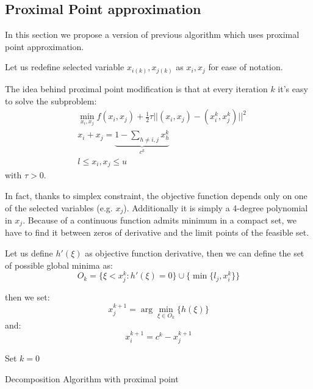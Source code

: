 \subsection{Proximal Point approximation}
In this section we propose a version of previous algorithm which uses proximal point approximation.

Let us redefine selected variable $x_{i(k)},x_{j(k)}$ as $x_{i},x_{j}$ for ease of notation.

The idea behind proximal point modification is that at every iteration $k$ it's easy to solve the subproblem:
\begin{align}
 &\min_{x_i,x_j} f(x_i,x_j)+ \frac{1}{2} \tau||(x_i,x_j)-(x_i^k,x_j^k)||^2\\
 &x_i+x_j = \underbrace{1-\sum_{h \ne i,j} x^k_h}_{c^k}\\
 &l \le x_i,x_j\le u
 \end{align}
with $\tau>0$.

In fact, thanks to simplex constraint, the objective function depends only on one of the selected variables (e.g. $x_j$). 
Additionally it is simply a 4-degree polynomial in $x_j$.
Because of a continuous function admits minimum in a compact set, we have to find it between zeros of derivative and the limit points of the feasible set.

Let us define $h'(\xi)$ as objective function derivative, then we can define the set of possible global minima as:
\begin{equation}
 O_k = \{ \xi < x_j^k: h'(\xi)=0\} \cup \{\min\{l_j,x_i^k\} \}
\end{equation}

then we set:
\begin{equation}
x_j^{k+1}= \arg \min_{\xi \in O_k} \{h(\xi)\}
\end{equation}
and:
\begin{equation}
x_i^{k+1}= c^{k}-x^{k+1}_j
\end{equation}



\begin{algorithm}[ht]
 Set $k = 0$\\
 \caption{Decomposition Algorithm with proximal point}
\end{algorithm}

